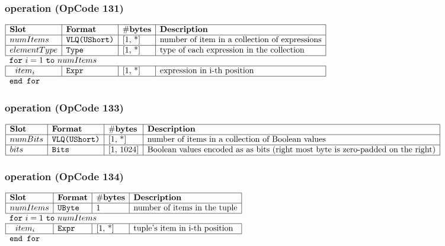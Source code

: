 
\subsubsection{ operation (OpCode 131)}

\noindent
\(\begin{array}{| l | l | l | l |}
    \hline
    \bf{Slot} & \bf{Format} & \bf{\#bytes} & \bf{Description} \\
    \hline
         numItems & \lst{VLQ(UShort)} & \text{[1, *]} & \text{number of item in a collection of expressions} \\
    \hline
           elementType & \lst{Type} & \text{[1, *]} & \text{type of each expression in the collection} \\
    \hline
          \multicolumn{4}{l}{\lst{for}~i=1~\lst{to}~numItems} \\
    \hline
             ~~ item_i & \lst{Expr} & \text{[1, *]} & \text{expression in i-th position} \\
    \hline
          \multicolumn{4}{l}{\lst{end for}} \\
\end{array}\)
       

\subsubsection{ operation (OpCode 133)}

\noindent
\(\begin{array}{| l | l | l | l |}
    \hline
    \bf{Slot} & \bf{Format} & \bf{\#bytes} & \bf{Description} \\
    \hline
         numBits & \lst{VLQ(UShort)} & \text{[1, *]} & \text{number of items in a collection of Boolean values} \\
    \hline
           bits & \lst{Bits} & \text{[1, 1024]} & \text{Boolean values encoded as as bits (right most byte is zero-padded on the right)} \\
    \hline
      
\end{array}\)
       

\subsubsection{ operation (OpCode 134)}

\noindent
\(\begin{array}{| l | l | l | l |}
    \hline
    \bf{Slot} & \bf{Format} & \bf{\#bytes} & \bf{Description} \\
    \hline
         numItems & \lst{UByte} & \text{1} & \text{number of items in the tuple} \\
    \hline
          \multicolumn{4}{l}{\lst{for}~i=1~\lst{to}~numItems} \\
    \hline
             ~~ item_i & \lst{Expr} & \text{[1, *]} & \text{tuple's item in i-th position} \\
    \hline
          \multicolumn{4}{l}{\lst{end for}} \\
\end{array}\)
       

